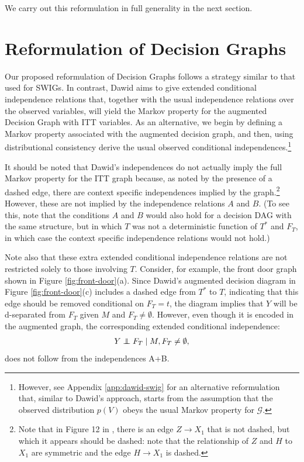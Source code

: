 \documentclass[11pt]{article}
\newcommand{\G}{{\mathscr G}}
\newcommand\indep{\protect\mathpalette{\protect\independenT}{\perp}}
\def\independenT#1#2{\mathrel{\rlap{$#1#2$}\mkern2.5mu{#1#2}}}
\begin{document}
{We carry out this reformulation in full generality in the next section.


 \section{Reformulation of Decision Graphs}
 
Our proposed reformulation of Decision Graphs follows a strategy similar to that used for SWIGs.
In contrast, Dawid aims to give extended conditional independence relations that, together with the usual independence relations over the observed variables, will yield the Markov property for the augmented Decision Graph with ITT variables. As an alternative, we begin by defining a Markov property associated with the augmented decision graph, and then, using distributional consistency derive the usual observed conditional independences.\footnote{However, see Appendix \ref{app:dawid-swig} for an alternative reformulation that, similar to Dawid's approach, starts from the assumption that the observed distribution $p(V)$ obeys the usual Markov property for $\G$.}
 
It should be noted that Dawid's independences do not actually imply the full Markov property for the ITT graph because, as noted by the presence of a dashed edge, there are context specific independences implied by the graph.\footnote{Note that in Figure 12 in \citep{dawid:2021},
there is an edge $Z\rightarrow X_1$ that is not dashed, but which it appears should be dashed: note that the relationship of $Z$ and $H$ to $X_1$ are symmetric and the edge $H \rightarrow X_1$ is dashed.}
 However, these are not implied by the independence relations $A$ and $B$. (To see this, note that the conditions $A$ and $B$ would also hold for a decision DAG with the same structure, but in which $T$ was not a deterministic function of $T^*$ and $F_T$, in which case the context specific independence relations would not hold.)
 
Note also that these extra extended conditional independence relations are not restricted solely to those involving $T$. Consider, for example, the 
front door graph shown in Figure  \ref{fig:front-door}(a). 
Since Dawid's augmented decision diagram in Figure  \ref{fig:front-door}(c) includes a dashed edge from $T^*$ to $T$, indicating that this edge should be removed conditional on $F_T=t$, the diagram implies that $Y$ will be d-separated from $F_T$ given $M$ and $F_T\neq \emptyset$. However, even though it is encoded in the augmented graph, the corresponding extended conditional independence:
\begin{align}\label{eq:front-door-specific}
Y \indep F_T \mid M, F_T \neq \emptyset,
\end{align}
does not follow from the independences A+B.

}
\end{document}
